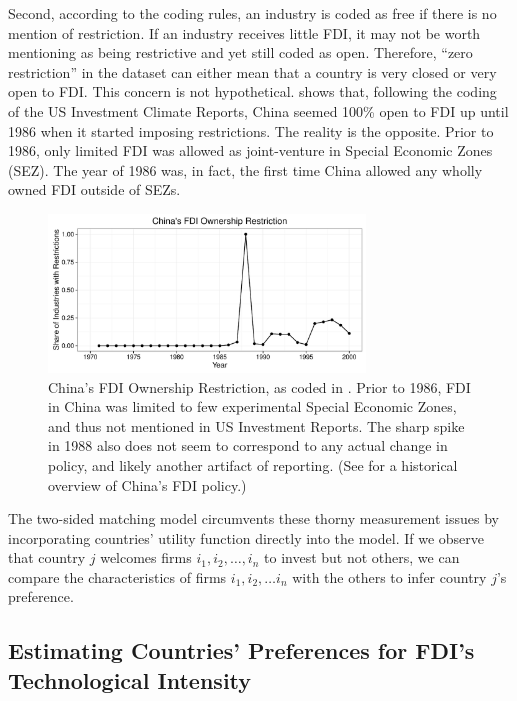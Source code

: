 Second, according to the coding rules, an industry is coded as free if there is no mention of restriction. If an industry receives little FDI, it may not be worth mentioning as being restrictive and yet still coded as open. Therefore, ``zero restriction'' in the dataset can either mean that a country is very closed or very open to FDI. This concern is not hypothetical.  shows that, following the coding of the US Investment Climate Reports, China seemed 100\% open to FDI up until 1986 when it started imposing restrictions. The reality is the opposite. Prior to 1986, only limited FDI was allowed as joint-venture in Special Economic Zones (SEZ). The year of 1986 was, in fact, the first time China allowed any wholly owned FDI outside of SEZs.

\begin{figure}[!ht]
\centering
\includegraphics[width=0.75\textwidth,keepaspectratio]{../figure/china_fdi_restriction}
\caption{China's FDI Ownership Restriction, as coded in \citet{Pandya2010}. Prior to 1986, FDI in China was limited to few experimental Special Economic Zones, and thus not mentioned in US Investment Reports. The sharp spike in 1988 also does not seem to correspond to any actual change in policy, and likely another artifact of reporting. (See \citet{Zebregs2002} for a historical overview of China's FDI policy.)}
\label{fig:china_fdi_restriction}
\end{figure}

The two-sided matching model circumvents these thorny measurement issues by incorporating countries' utility function directly into the model. If we observe that country $j$ welcomes firms $i_1, i_2, \dots, i_n$ to invest but not others, we can compare the characteristics of firms $i_1, i_2, \dots i_n$ with the others to infer country $j$'s preference.


\subsection{Estimating Countries' Preferences for FDI's Technological Intensity}

